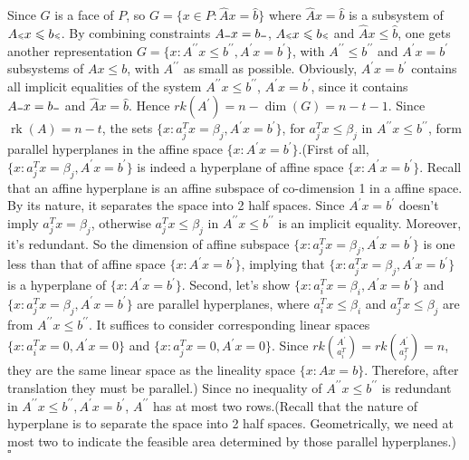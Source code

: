 \documentclass{article}
\DeclareMathOperator{\rk}{rk}
\newcommand{\tleq}{{\mbox{\tiny $\leqslant$}}}
\newcommand{\teq}{{\mbox{\tiny $=$}}}
\newenvironment{proof}{{\it Proof.}}{ \hfill $\square$}
\begin{document}
\begin{proof}
Since $G$ is a face of $P$, so $G=\{x\in P: \hat{A}x=\hat{b}\}$ where $\hat{A}x=\hat{b}$ is a subsystem of $A\tleq x\leqslant b\tleq$. By combining constraints $A\teq x=b\teq$, $A\tleq x\leqslant b\tleq$ and $\hat{A}x\leqslant \hat{b}$, one gets another representation $G=\{x:A^{\prime\prime} x\leqslant b^{\prime\prime}, A^\prime x=b^\prime\}$, with $A^{\prime\prime} \leqslant b^{\prime\prime}$ and $A^\prime x=b^\prime$ subsystems of $Ax\leqslant b$, with $A^{\prime\prime}$ as small as possible. Obviously, $A^\prime x=b^\prime$ contains all implicit equalities of the system $A^{\prime\prime} x\leqslant b^{\prime\prime}$, $A^\prime x=b^\prime$, since it contains $A\teq x=b\teq$ and $\hat{A}x=\hat{b}$. Hence $rk(A^\prime)=n-\dim(G)=n-t-1$. Since $\rk(A)=n-t$, the sets $\{x: a_j^T x=\beta_j , A^\prime x=b^\prime\}$, for $a_j^T x\leqslant \beta_j$ in $A^{\prime\prime}x\leqslant b^{\prime\prime}$, form parallel hyperplanes in the affine space $\{x:A^\prime x=b^\prime\}$.(First of all, $\{x: a_j^T x=\beta_j , A^\prime x=b^\prime\}$ is indeed a hyperplane of affine space $\{x:A^\prime x=b^\prime\}$. Recall that an affine hyperplane is an affine subspace of co-dimension 1 in a affine space. By its nature, it separates the space into 2 half spaces. Since $A^\prime x=b^\prime$ doesn't imply $a_j^T x=\beta_j$, otherwise $a_j^T x\leqslant \beta_j$ in $A^{\prime\prime}x\leqslant b^{\prime\prime}$ is an implicit equality. Moreover, it's redundant. So the dimension of affine subspace $\{x: a_j^T x=\beta_j , A^\prime x=b^\prime\}$ is one less than that of affine space $\{x:A^\prime x=b^\prime\}$, implying that $\{x: a_j^T x=\beta_j , A^\prime x=b^\prime\}$ is a hyperplane of $\{x:A^\prime x=b^\prime\}$. Second, let's show $\{x: a_i^T x=\beta_i , A^\prime x=b^\prime\}$ and $\{x: a_j^T x=\beta_j , A^\prime x=b^\prime\}$ are parallel hyperplanes, where $a_i^T x\leqslant\beta_i$ and $a_j^T x\leqslant \beta_j$ are from $A^{\prime\prime}x\leqslant b^{\prime\prime}$. It suffices to consider corresponding linear spaces $\{x: a_i^T x=0 , A^\prime x=0\}$ and $\{x: a_j^T x=0 , A^\prime x=0\}$. Since $rk{\binom{A^\prime}{a_i^T}}=rk{\binom{A^\prime}{a_j^T}}=n$, they are the same linear space as the lineality space $\{x:Ax=b\}$. Therefore, after translation they must be parallel.) Since no inequality of $A^{\prime\prime}x\leqslant b^{\prime\prime}$ is redundant in $A^{\prime\prime}x\leqslant b^{\prime\prime}, A^\prime x=b^\prime$, $A^{\prime\prime}$ has at most two rows.(Recall that the nature of hyperplane is to separate the space into 2 half spaces. Geometrically, we need at most two to indicate the feasible area determined by those parallel hyperplanes.)
\end{proof}
\end{document}
